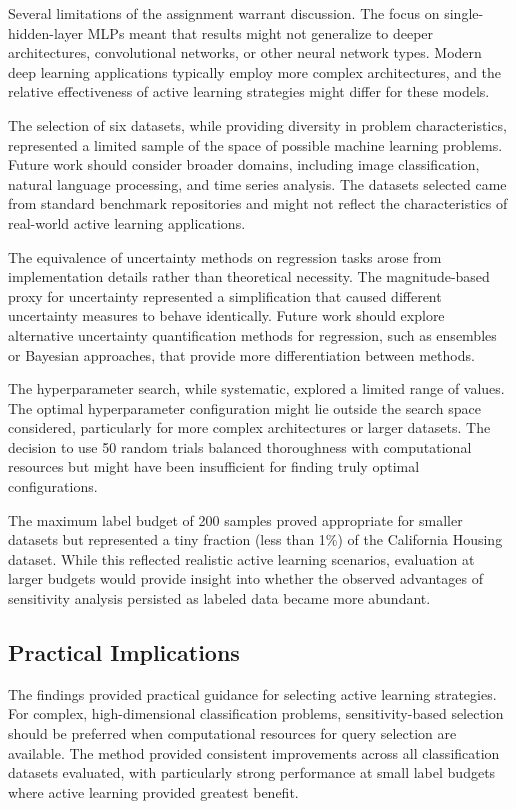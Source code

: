 \documentclass[conference]{IEEEtran}
\begin{document}
Several limitations of the assignment warrant discussion. The focus on single-hidden-layer MLPs meant that results might not generalize to deeper architectures, convolutional networks, or other neural network types. Modern deep learning applications typically employ more complex architectures, and the relative effectiveness of active learning strategies might differ for these models.

The selection of six datasets, while providing diversity in problem characteristics, represented a limited sample of the space of possible machine learning problems. Future work should consider broader domains, including image classification, natural language processing, and time series analysis. The datasets selected came from standard benchmark repositories and might not reflect the characteristics of real-world active learning applications.

The equivalence of uncertainty methods on regression tasks arose from implementation details rather than theoretical necessity. The magnitude-based proxy for uncertainty represented a simplification that caused different uncertainty measures to behave identically. Future work should explore alternative uncertainty quantification methods for regression, such as ensembles or Bayesian approaches, that provide more differentiation between methods.

The hyperparameter search, while systematic, explored a limited range of values. The optimal hyperparameter configuration might lie outside the search space considered, particularly for more complex architectures or larger datasets. The decision to use 50 random trials balanced thoroughness with computational resources but might have been insufficient for finding truly optimal configurations.

The maximum label budget of 200 samples proved appropriate for smaller datasets but represented a tiny fraction (less than 1\%) of the California Housing dataset. While this reflected realistic active learning scenarios, evaluation at larger budgets would provide insight into whether the observed advantages of sensitivity analysis persisted as labeled data became more abundant.

\subsection{Practical Implications}

The findings provided practical guidance for selecting active learning strategies. For complex, high-dimensional classification problems, sensitivity-based selection should be preferred when computational resources for query selection are available. The method provided consistent improvements across all classification datasets evaluated, with particularly strong performance at small label budgets where active learning provided greatest benefit.
\end{document}
